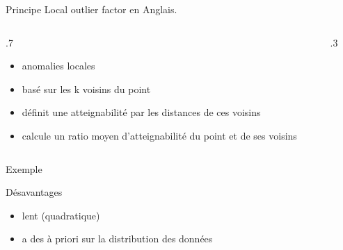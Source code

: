 \begin{frame}{Principe}
  Local outlier factor en Anglais.
  \begin{columns}
    \begin{column}{.7\tw}
      \begin{itemize}[<+->]
        \item anomalies locales
        \item basé sur les k voisins du point
        \item définit une \og atteignabilité\fg{} par les distances de ces voisins
        \item calcule un ratio moyen d'atteignabilité du point et de ses voisins
      \end{itemize}
    \end{column}
    \begin{column}{.3\tw}
    \end{column}
  \end{columns}

\end{frame}

\begin{frame}{Exemple}
\end{frame}

\begin{frame}{Désavantages}
  \begin{itemize}
  \item lent (quadratique)
  \item a des à priori sur la distribution des données
  \end{itemize}
\end{frame}
